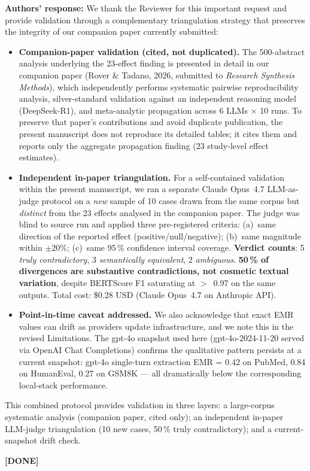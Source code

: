 \documentclass[11pt,a4paper]{article}
\newcommand{\response}[1]{\par\noindent\textbf{\color{revgreen}Authors' response:} #1\par}
\newcommand{\done}{\color{revgreen}\textbf{[DONE]}}
\begin{document}
\response{We thank the Reviewer for this important request and provide validation through a complementary triangulation strategy that preserves the integrity of our companion paper currently submitted:

\begin{itemize}[leftmargin=*]
  \item \textbf{Companion-paper validation (cited, not duplicated).} The 500-abstract analysis underlying the 23-effect finding is presented in detail in our companion paper (Rover \& Tadano, 2026, submitted to \emph{Research Synthesis Methods}), which independently performs systematic pairwise reproducibility analysis, silver-standard validation against an independent reasoning model (DeepSeek-R1), and meta-analytic propagation across 6 LLMs $\times$ 10 runs. To preserve that paper's contributions and avoid duplicate publication, the present manuscript does not reproduce its detailed tables; it cites them and reports only the aggregate propagation finding (23 study-level effect estimates).
  \item \textbf{Independent in-paper triangulation.} For a self-contained validation within the present manuscript, we ran a separate Claude Opus~4.7 LLM-as-judge protocol on a \emph{new} sample of 10 cases drawn from the same corpus but \emph{distinct} from the 23 effects analysed in the companion paper. The judge was blind to source run and applied three pre-registered criteria: (a)~same direction of the reported effect (positive/null/negative); (b)~same magnitude within $\pm 20\%$; (c)~same 95\,\% confidence interval coverage. \textbf{Verdict counts}: 5 \emph{truly contradictory}, 3 \emph{semantically equivalent}, 2 \emph{ambiguous}. \textbf{50\,\% of divergences are substantive contradictions, not cosmetic textual variation}, despite BERTScore F1 saturating at $>$~0.97 on the same outputs. Total cost: \$0.28 USD (Claude Opus~4.7 on Anthropic API).
  \item \textbf{Point-in-time caveat addressed.} We also acknowledge that exact EMR values can drift as providers update infrastructure, and we note this in the revised Limitations. The gpt-4o snapshot used here (gpt-4o-2024-11-20 served via OpenAI Chat Completions) confirms the qualitative pattern persists at a current snapshot: gpt-4o single-turn extraction EMR = 0.42 on PubMed, 0.84 on HumanEval, 0.27 on GSM8K --- all dramatically below the corresponding local-stack performance.
\end{itemize}

This combined protocol provides validation in three layers: a large-corpus systematic analysis (companion paper, cited only); an independent in-paper LLM-judge triangulation (10 new cases, 50\,\% truly contradictory); and a current-snapshot drift check.} \done
\end{document}
